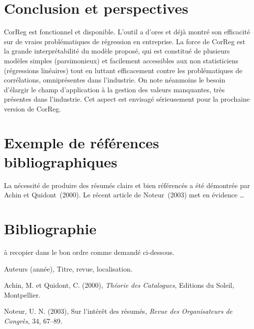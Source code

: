 \documentclass[12pt]{article}
\begin{document}
\section{Conclusion et perspectives}
	CorReg est fonctionnel et disponible. L'outil a d'ores et déjà montré son efficacité sur de vraies problématiques de régression en entreprise.
	La force de CorReg est la grande interprétabilité du modèle proposé, qui est constitué de plusieurs modèles simples (parsimonieux) et facilement accessibles aux non statisticiens (régressions linéaires) tout en luttant efficacement contre les problématiques de corrélations, omniprésentes dans l'industrie.
	On note néanmoins le besoin d'élargir le champ d'application à la gestion des valeurs manquantes, très présentes dans l'industrie. Cet aspect est envisagé sérieusement pour la prochaine version de CorReg.
	
\section{Exemple de références bibliographiques}
La nécessité de produire des résumés clairs et bien
référencés a été démontrée par Achin et Quidont~(2000). Le
récent article de Noteur~(2003) met en évidence \dots

\section*{Bibliographie}
{}

à recopier dans le bon ordre comme demandé ci-dessous.

\noindent [1] Auteurs (année), Titre, revue, localisation.

\noindent [2] Achin, M. et Quidont, C. (2000), {\it Théorie des
Catalogues}, Editions du Soleil, Montpellier.

\noindent [3] Noteur, U. N. (2003), Sur l'intér\^et des
résumés, {\it Revue des Organisateurs de Congrès}, 34, 67--89.
\end{document}
